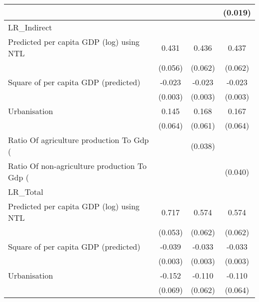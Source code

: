 {\begin{tabular}{l*{3}{c}}
                    &                     &                     &     (0.019)         \\
\hline
LR\_Indirect         &                     &                     &                     \\
Predicted per capita GDP (log) using NTL&       0.431\sym{***}&       0.436\sym{***}&       0.437\sym{***}\\
                    &     (0.056)         &     (0.062)         &     (0.062)         \\
[1em]
Square of per capita GDP (predicted)&      -0.023\sym{***}&      -0.023\sym{***}&      -0.023\sym{***}\\
                    &     (0.003)         &     (0.003)         &     (0.003)         \\
[1em]
Urbanisation        &       0.145\sym{**} &       0.168\sym{***}&       0.167\sym{***}\\
                    &     (0.064)         &     (0.061)         &     (0.064)         \\
[1em]
Ratio Of agriculture production To Gdp (%
                    &                     &     (0.038)         &                     \\
[1em]
Ratio Of non-agriculture production To Gdp (%
                    &                     &                     &     (0.040)         \\
\hline
LR\_Total            &                     &                     &                     \\
Predicted per capita GDP (log) using NTL&       0.717\sym{***}&       0.574\sym{***}&       0.574\sym{***}\\
                    &     (0.053)         &     (0.062)         &     (0.062)         \\
[1em]
Square of per capita GDP (predicted)&      -0.039\sym{***}&      -0.033\sym{***}&      -0.033\sym{***}\\
                    &     (0.003)         &     (0.003)         &     (0.003)         \\
[1em]
Urbanisation        &      -0.152\sym{**} &      -0.110\sym{*}  &      -0.110\sym{*}  \\
                    &     (0.069)         &     (0.062)         &     (0.064)         \\

\end{tabular}}
